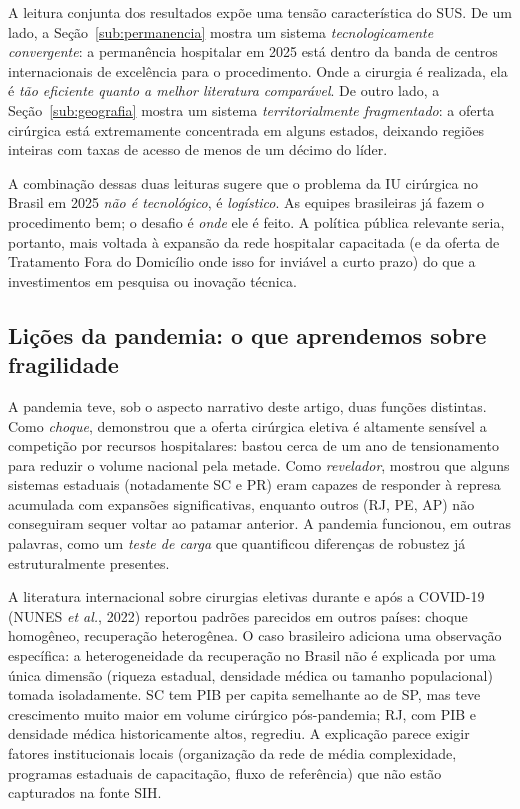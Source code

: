 \documentclass[12pt,a4paper,oneside]{article}
\begin{document}
A leitura conjunta dos resultados expõe uma tensão característica
do SUS. De um lado, a Seção~\ref{sub:permanencia} mostra um sistema
\textit{tecnologicamente convergente}: a permanência hospitalar
em 2025 está dentro da banda de centros internacionais de excelência
para o procedimento. Onde a cirurgia é realizada, ela é
\textit{tão eficiente quanto a melhor literatura comparável}. De
outro lado, a Seção~\ref{sub:geografia} mostra um sistema
\textit{territorialmente fragmentado}: a oferta cirúrgica está
extremamente concentrada em alguns estados, deixando regiões
inteiras com taxas de acesso de menos de um décimo do líder.

A combinação dessas duas leituras sugere que o problema da IU
cirúrgica no Brasil em 2025 \textit{não é tecnológico}, é
\textit{logístico}. As equipes brasileiras já fazem o procedimento
bem; o desafio é \textit{onde} ele é feito. A política pública
relevante seria, portanto, mais voltada à expansão da rede
hospitalar capacitada (e da oferta de Tratamento Fora do
Domicílio onde isso for inviável a curto prazo) do que a
investimentos em pesquisa ou inovação técnica.

\subsection{Lições da pandemia: o que aprendemos sobre fragilidade}

A pandemia teve, sob o aspecto narrativo deste artigo, duas
funções distintas. Como \textit{choque}, demonstrou que a
oferta cirúrgica eletiva é altamente sensível a competição por
recursos hospitalares: bastou cerca de um ano de tensionamento
para reduzir o volume nacional pela metade. Como
\textit{revelador}, mostrou que alguns sistemas estaduais
(notadamente SC e PR) eram capazes de responder à represa
acumulada com expansões significativas, enquanto outros (RJ,
PE, AP) não conseguiram sequer voltar ao patamar anterior. A
pandemia funcionou, em outras palavras, como um \textit{teste
de carga} que quantificou diferenças de robustez já
estruturalmente presentes.

A literatura internacional sobre cirurgias eletivas durante e
após a COVID-19 (NUNES \textit{et al.}, 2022) reportou padrões
parecidos em outros países: choque homogêneo, recuperação
heterogênea. O caso brasileiro adiciona uma observação
específica: a heterogeneidade da recuperação no Brasil não é
explicada por uma única dimensão (riqueza estadual, densidade
médica ou tamanho populacional) tomada isoladamente. SC tem PIB
per capita semelhante ao de SP, mas teve crescimento muito
maior em volume cirúrgico pós-pandemia; RJ, com PIB e densidade
médica historicamente altos, regrediu. A explicação parece exigir
fatores institucionais locais (organização da rede de média
complexidade, programas estaduais de capacitação, fluxo de
referência) que não estão capturados na fonte SIH.
\end{document}
